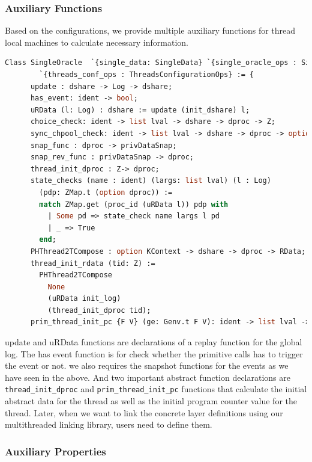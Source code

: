 \subsubsection{Auxiliary Functions}

Based on the configurations, we provide multiple auxiliary functions 
for thread local machines to calculate necessary information. 
\begin{lstlisting}[language=Caml]
  Class SingleOracle  `{single_data: SingleData} `{single_oracle_ops : SingleOracleOps}  
        `{threads_conf_ops : ThreadsConfigurationOps} := {
      update : dshare -> Log -> dshare;
      has_event: ident -> bool;      
      uRData (l: Log) : dshare := update (init_dshare) l;      
      choice_check: ident -> list lval -> dshare -> dproc -> Z;
      sync_chpool_check: ident -> list lval -> dshare -> dproc -> option SyncChanPool;
      snap_func : dproc -> privDataSnap;
      snap_rev_func : privDataSnap -> dproc; 
      thread_init_dproc : Z-> dproc;
      state_checks (name : ident) (largs: list lval) (l : Log) 
        (pdp: ZMap.t (option dproc)) :=
        match ZMap.get (proc_id (uRData l)) pdp with 
          | Some pd => state_check name largs l pd
          | _ => True
        end;
      PHThread2TCompose : option KContext -> dshare -> dproc -> RData;      
      thread_init_rdata (tid: Z) :=
        PHThread2TCompose
          None
          (uRData init_log)
          (thread_init_dproc tid);
      prim_thread_init_pc {F V} (ge: Genv.t F V): ident -> list lval -> option val }.
\end{lstlisting}
update and uRData functions are  declarations of a replay function for the global log. 
The has event function is for check whether the primitive calls has to trigger the event or not. 
we also requires the snapshot functions for the events as we have seen in the above.
And two important abstract function declarations 
are \lstinline$thread_init_dproc$ and \lstinline$prim_thread_init_pc$ functions 
that calculate the initial abstract data for the thread as well as the initial program counter value 
for the thread. 
Later, when we want to link the concrete layer definitions using our multithreaded linking library, users need to define them.

\subsubsection{Auxiliary Properties}

